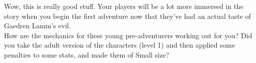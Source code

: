 Wow, this is really good stuff. Your players will be a lot more immersed in the story when you begin the first adventure now that they've had an actual taste of Gaedren Lamm's evil.\\

How are the mechanics for these young pre-adventurers working out for you? Did you take the adult version of the characters (level 1) and then applied some penalties to some stats, and made them of Small size?\\

